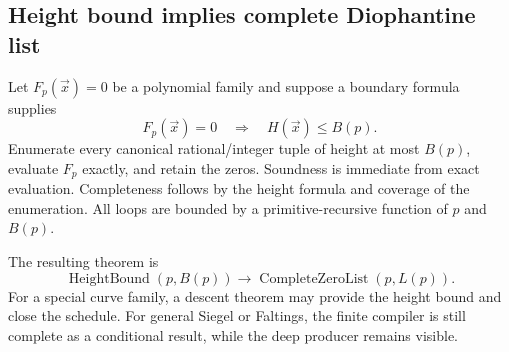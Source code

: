 \subsection{Height bound implies complete Diophantine list}

Let \(F_p(\vec x)=0\) be a polynomial family and suppose a boundary formula supplies
\[
  F_p(\vec x)=0\quad\Longrightarrow\quad H(\vec x)\le B(p).
\]
Enumerate every canonical rational/integer tuple of height at most \(B(p)\), evaluate
\(F_p\) exactly, and retain the zeros.  Soundness is immediate from exact evaluation.
Completeness follows by the height formula and coverage of the enumeration.  All loops
are bounded by a primitive-recursive function of \(p\) and \(B(p)\).

The resulting theorem is
\[
  \operatorname{HeightBound}(p,B(p))
  \longrightarrow
  \operatorname{CompleteZeroList}(p,L(p)).
\]
For a special curve family, a descent theorem may provide the height bound and close
the schedule.  For general Siegel or Faltings, the finite compiler is still complete as
a conditional result, while the deep producer remains visible.
